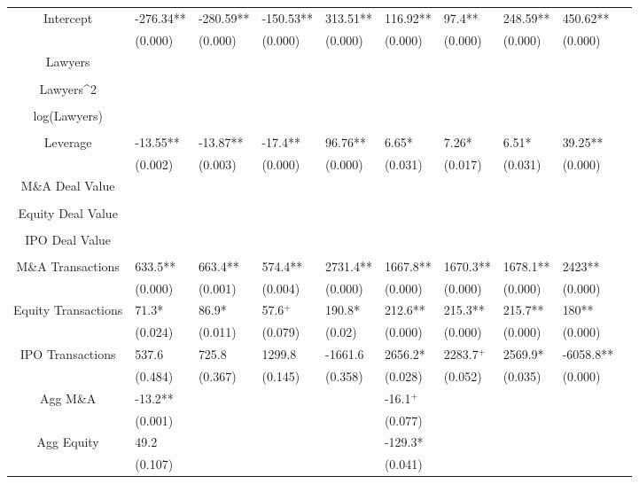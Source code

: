 \documentclass{article}
\begin{document}
\begin{table}[H]
\begin{tabular}{|clllllllll|}
Intercept & -276.34** & -280.59** & -150.53** & 313.51** & 116.92** & 97.4** & 248.59** & 450.62** & \\
   & (0.000) & (0.000) & (0.000) & (0.000) & (0.000) & (0.000) & (0.000) & (0.000) & \\
  Lawyers &  &  &  &  &  &  &  &  & \\
   &  &  &  &  &  &  &  &  & \\
  Lawyers^2 &  &  &  &  &  &  &  &  & \\
   &  &  &  &  &  &  &  &  & \\
  log(Lawyers) &  &  &  &  &  &  &  &  & \\
   &  &  &  &  &  &  &  &  & \\
  Leverage & -13.55** & -13.87** & -17.4** & 96.76** & 6.65* & 7.26* & 6.51* & 39.25** & \\
   & (0.002) & (0.003) & (0.000) & (0.000) & (0.031) & (0.017) & (0.031) & (0.000) & \\
  M\&A Deal Value &  &  &  &  &  &  &  &  & \\
   &  &  &  &  &  &  &  &  & \\
  Equity Deal Value &  &  &  &  &  &  &  &  & \\
   &  &  &  &  &  &  &  &  & \\
  IPO Deal Value &  &  &  &  &  &  &  &  & \\
   &  &  &  &  &  &  &  &  & \\
  M\&A Transactions & 633.5** & 663.4** & 574.4** & 2731.4** & 1667.8** & 1670.3** & 1678.1** & 2423** & \\
   & (0.000) & (0.001) & (0.004) & (0.000) & (0.000) & (0.000) & (0.000) & (0.000) & \\
  Equity Transactions & 71.3* & 86.9* & 57.6$^{+}$ & 190.8* & 212.6** & 215.3** & 215.7** & 180** & \\
   & (0.024) & (0.011) & (0.079) & (0.02) & (0.000) & (0.000) & (0.000) & (0.000) & \\
  IPO Transactions & 537.6 & 725.8 & 1299.8 & -1661.6 & 2656.2* & 2283.7$^{+}$ & 2569.9* & -6058.8** & \\
   & (0.484) & (0.367) & (0.145) & (0.358) & (0.028) & (0.052) & (0.035) & (0.000) & \\
  Agg M\&A & -13.2** &  &  &  & -16.1$^{+}$ &  &  &  & \\
   & (0.001) &  &  &  & (0.077) &  &  &  & \\
  Agg Equity & 49.2 &  &  &  & -129.3* &  &  &  & \\
   & (0.107) &  &  &  & (0.041) &  &  &  & \\

\end{tabular}
\end{table}
\end{document}
